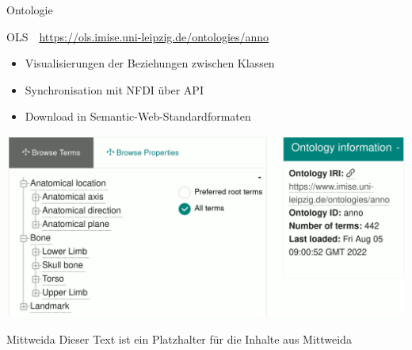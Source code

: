 \documentclass[portrait,final,a0paper,fontscale=0.320]{imiseposter}
\begin{document}
\begin{poster}
\begin{posterbox}[name=ontology,below=background]{Ontologie}
\begin{subsectionbox}{OLS~\cite{ols}~\small\url{https://ols.imise.uni-leipzig.de/ontologies/anno}}
\begin{itemize}
\item Visualisierungen der Beziehungen zwischen Klassen
\item Synchronisation mit NFDI über API
\item Download in Semantic-Web-Standardformaten
\end{itemize}

\includegraphics[width=\textwidth]{img/ols.png}
\end{subsectionbox}

\end{posterbox}
\begin{posterbox}[name=results,column=1]{Mittweida}
Dieser Text ist ein Platzhalter für die Inhalte aus Mittweida


\end{posterbox}
\end{poster}
\end{document}
